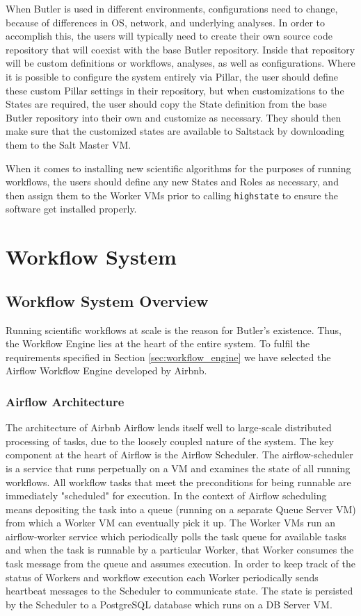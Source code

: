 When Butler is used in different environments, configurations need to change, because of differences in OS, network, and underlying analyses. In order to accomplish this, the users will typically need to create their own source code repository that will coexist with the base Butler repository. Inside that repository will be custom definitions or workflows, analyses, as well as configurations. Where it is possible to configure the system entirely via Pillar, the user should define these custom Pillar settings in their repository, but when customizations to the States are required, the user should copy the State definition from the base Butler repository into their own and customize as necessary. They should then make sure that the customized states are available to Saltstack by downloading them to the Salt Master VM.

When it comes to installing new scientific algorithms for the purposes of running workflows, the users should define any new States and Roles as necessary, and then assign them to the Worker VMs prior to calling \texttt{highstate} to ensure the software get installed properly. 

\section{Workflow System}\label{sec:design_workflow_system}
\subsection{Workflow System Overview}
Running scientific workflows at scale is the reason for Butler's existence. Thus, the Workflow Engine lies at the heart of the entire system. To fulfil the requirements specified in Section \ref{sec:workflow_engine} we have selected the Airflow Workflow Engine developed by Airbnb. 

\subsubsection {Airflow Architecture}

The architecture of Airbnb Airflow lends itself well to large-scale distributed processing of tasks, due to the loosely coupled nature of the system. The key component at the heart of Airflow is the Airflow Scheduler. The airflow-scheduler is a service that runs perpetually on a VM and examines the state of all running workflows. All workflow tasks that meet the preconditions for being runnable are immediately "scheduled" for execution. In the context of Airflow scheduling means depositing the task into a queue (running on a separate Queue Server VM) from which a Worker VM can eventually pick it up. The Worker VMs run an airflow-worker service which periodically polls the task queue for available tasks and when the task is runnable by a particular Worker, that Worker consumes the task message from the queue and assumes execution. In order to keep track of the status of Workers and workflow execution each Worker periodically sends heartbeat messages to the Scheduler to communicate state. The state is persisted by the Scheduler to a PostgreSQL database which runs on a DB Server VM.

